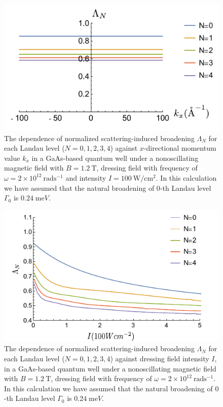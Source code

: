\begin{figure}[t]
\includegraphics[scale=0.68]{figures/fig_3}
\caption{\label{fig_3} The dependence of normalized scattering-induced broadening $\Lambda_N$ for each Landau level ($N =0,1,2,3,4$) against $x$-directional momentum value $k_x$ in a GaAs-based quantum well under a nonoscillating magnetic field with $B = 1.2~\text{T}$, dressing field with frequency of $\omega =2\times10^{12}~\text{rad}\text{s}^{-1}$ and intensity $I =100~\text{W}/\text{cm}^{2}$.
In this calculation we have assumed that the natural  broadening of $0$-th Landau level $\Gamma_0$ is $0.24\;\text{me}V$.}
\end{figure}

\begin{figure}[t]
\includegraphics[scale=0.68]{figures/fig_4}
\caption{\label{fig_4} The dependence of normalized scattering-induced broadening $\Lambda_N$ for each Landau level ($N =0,1,2,3,4$) against dressing field intensity $I$, in a GaAs-based quantum well under a nonoscillating magnetic field with $B = 1.2~\text{T}$, dressing field with frequency of $\omega =2\times10^{12}~\text{rad}\text{s}^{-1}$. In this calculation we have assumed that the natural broadening of $0$-th Landau level $\Gamma_0$ is $0.24\;\text{me}V$.}
\end{figure}

